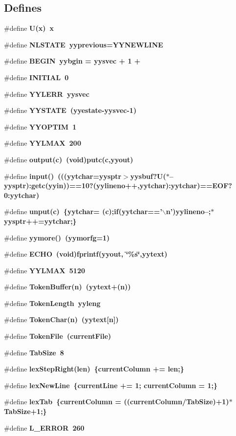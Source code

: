 \subsection*{Defines}
\begin{CompactItemize}
\item 
\#define \bf{U}(x)~x
\item 
\#define \bf{NLSTATE}~\bf{yyprevious}=YYNEWLINE
\item 
\#define \bf{BEGIN}~\bf{yybgin} = \bf{yysvec} + 1 +
\item 
\#define \bf{INITIAL}~0
\item 
\#define \bf{YYLERR}~\bf{yysvec}
\item 
\#define \bf{YYSTATE}~(\bf{yyestate}-\bf{yysvec}-1)
\item 
\#define \bf{YYOPTIM}~1
\item 
\#define \bf{YYLMAX}~200
\item 
\#define \bf{output}(c)~(void)putc(c,\bf{yyout})
\item 
\#define \bf{input}()~(((\bf{yytchar}=\bf{yysptr}$>$\bf{yysbuf}?U($\ast$--\bf{yysptr}):getc(\bf{yyin}))==10?(\bf{yylineno}++,\bf{yytchar}):\bf{yytchar})==EOF?0:\bf{yytchar})
\item 
\#define \bf{unput}(c)~\{\bf{yytchar}= (c);if(\bf{yytchar}=='$\backslash$n')\bf{yylineno}--;$\ast$\bf{yysptr}++=\bf{yytchar};\}
\item 
\#define \bf{yymore}()~(\bf{yymorfg}=1)
\item 
\#define \bf{ECHO}~(void)fprintf(\bf{yyout}, \char`\"{}\%s\char`\"{},yytext)
\item 
\#define \bf{YYLMAX}~5120
\item 
\#define \bf{Token\-Buffer}(n)~(\bf{yytext}+(n))
\item 
\#define \bf{Token\-Length}~\bf{yyleng}
\item 
\#define \bf{Token\-Char}(n)~(\bf{yytext}[n])
\item 
\#define \bf{Token\-File}~(\bf{current\-File})
\item 
\#define \bf{Tab\-Size}~8
\item 
\#define \bf{lex\-Step\-Right}(len)~\{\bf{current\-Column} += len;\}
\item 
\#define \bf{lex\-New\-Line}~\{\bf{current\-Line} += 1; \bf{current\-Column} = 1;\}
\item 
\#define \bf{lex\-Tab}~\{\bf{current\-Column} = ((\bf{current\-Column}/Tab\-Size)+1)$\ast$Tab\-Size+1;\}
\item 
\#define \bf{L\_\-ERROR}~260
\item 

\end{CompactItemize}
